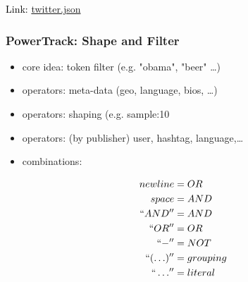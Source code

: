 \documentclass{beamer}
\begin{document}
{
\begin{frame}
  \begin{center}
\textcolor{black}{\Huge Link: \hyperlink{file://localhost/Users/scotthendrickson/Documents/DSBAMeetup2012/twitter_record.html}{twitter.json}}
  \end{center}
\end{frame}
}

\begin{frame}\frametitle{PowerTrack: Shape and Filter}
\begin{itemize}
\item core idea: token filter (e.g. "obama", "beer" \ldots)
\item operators: meta-data (geo, language, bios, \ldots)
\item operators: shaping (e.g. sample:10%
\item operators: (by publisher) user, hashtag, language,\ldots
\item combinations:  
\end{itemize}


\begin{equation*}
\begin{aligned}
        newline &= OR \\
        space &= AND \\
        ``AND'' &= AND \\
        ``OR'' &= OR \\
        ``-'' &= NOT \\
        ``(\ldots)'' &= grouping\\
        `` \ldots ''  &= literal \\
\end{aligned}
\end{equation*}
\end{frame}
\end{document}
